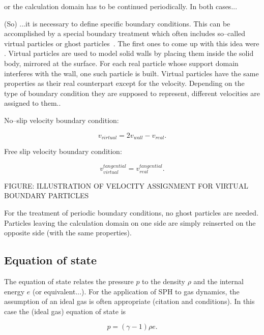 \documentclass{report}
\begin{document}
 or the calculation domain has to be continued periodically. In both cases...

(So) ...it is necessary to define specific boundary
conditions. This can be accomplished by a special boundary treatment which
often includes so--called virtual particles or ghost
particles~\cite{Liu2003}. The first ones to come up with this idea were
\cite{LIBERSKY1993}. Virtual particles are used to model solid walls by
placing them inside the solid body, mirrored at the surface. For each real
particle whose support domain interferes with the wall, one such particle is
built. Virtual particles have the same properties as their real counterpart
except for the velocity. Depending on the type of boundary condition they are
supposed to represent, different velocities are assigned to them.\cite{Hu2006}.

No--slip velocity boundary condition:

\begin{equation}
v_{virtual}=2v_{wall}-v_{real}.
\end{equation}

Free slip velocity boundary condition:

\begin{equation}
v_{virtual}^{tangential}=v_{real}^{tangential}.
\end{equation}

FIGURE: ILLUSTRATION OF VELOCITY ASSIGNMENT FOR VIRTUAL BOUNDARY PARTICLES

For the treatment of periodic boundary conditions, no ghost particles are
needed. Particles leaving the calculation domain on one side are simply
reinserted on the opposite side (with the same properties).


\subsection{Equation of state}


The equation of state relates the pressure $p$ 
to the density $\rho$ and the internal energy $e$ (or equivalent...). For the 
application of SPH to gas dynamics, the assumption of an ideal gas is often
appropriate (citation and conditions). In this case the (ideal gas) equation of state is



\begin{equation}
\label{eq:idealGasEqState}
 p=(\gamma-1)\rho e.
\end{equation}
\end{document}
